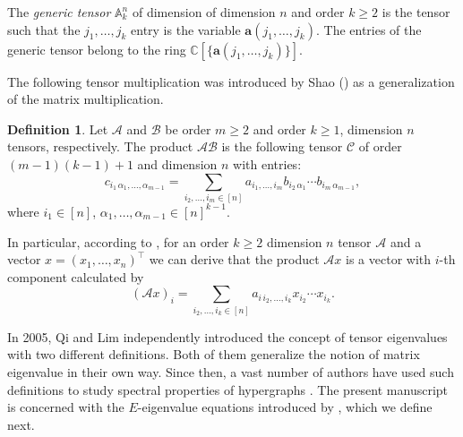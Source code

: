 \documentclass[12pt]{article}
\numberwithin{equation}{section}
\theoremstyle{definition}
\newtheorem{definition}{Definition}
\newcommand{\ev}[1]{( #1 )}
\newcommand{\C}{\mathbb{C}}
\begin{document}
The \textit{generic tensor} $\mathbb{A}^n_k$ of dimension of dimension $n$ and order $k\geq 2$ is the tensor such that the $j_1,\ldots,j_k$ entry is the variable $\mathbf{a}\ev{j_1,\ldots,j_k} $. The entries of the generic tensor belong to the ring $\C[\{\mathbf{a}\ev{j_1,\ldots,j_k}\}]$. 

The following tensor multiplication was introduced by Shao (\cite[Definition 1.1, p.~2352]{shao}) as a generalization of the matrix multiplication.

\begin{definition}\cite{shao}\label{def:tensorproduct}
Let $\mathcal{A}$ and $\mathcal{B}$ be order $m\geq 2$ and order $k\geq 1$, dimension $n$ tensors, respectively. The product $\mathcal{A} \mathcal{B}$ is the following tensor $\mathcal{C}$ of order $(m-1)(k-1)+1$ and dimension $n$ with entries:
$$c_{i_1\,\alpha_1, \ldots, \alpha_{m-1}} = \sum_{i_2,\ldots, i_m\in [n]} a_{i_1,\ldots, i_{m}} b_{i_2\,\alpha_{1}} \cdots b_{i_m\,\alpha_{m-1}},$$
where $i_1\in [n]$, $\alpha_1,\ldots,\alpha_{m-1} \in [n]^{k-1}$.
\end{definition}

In particular, according to \cite[Example 1.1]{shao}, for an order $k\geq 2$ dimension $n$ tensor $\mathcal{A}$ and a vector $x = (x_1,\ldots, x_n)^\top$ we can derive that the product $\mathcal{A} x$ is a vector with $i$-th component calculated by
\begin{equation}
\label{eqn:tensor_times_vect}
(\mathcal{A} x)_i=\sum_{i_2,\ldots, i_k\in [n]} a_{i\, i_2, \ldots, i_{k}} x_{i_2} \cdots x_{i_k}.
\end{equation}

In 2005, Qi \cite{Q2005} and Lim \cite{L2005} independently introduced the concept of tensor eigenvalues with two different definitions. Both of them generalize the notion of matrix eigenvalue in their own way. Since then, a vast number of authors have used such definitions to study spectral properties of hypergraphs \cite{C2012,CD2015,shao,SQH2015,W2022,XW2019,ZKSB2017}. The present manuscript is concerned with the $E$-eigenvalue equations introduced by \cite{Q2005}, which we define next. 
\end{document}
